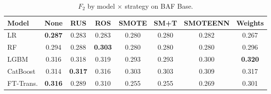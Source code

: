 \begin{table}[H]
\centering
\caption{$F_2$ by model $\times$ strategy on BAF Base.}
\label{tab:factorial_baf_f2}
\begin{tabular}{l c c c c c c c}
\toprule
Model & None & RUS & ROS & SMOTE & SM+T & SMOTEENN & Weights \\
\midrule
LR         & \textbf{0.287} & 0.283 & 0.283 & 0.280 & 0.280 & 0.282 & 0.267 \\
RF         & 0.294 & 0.288 & \textbf{0.303} & 0.280 & 0.280 & 0.280 & 0.296 \\
LGBM       & 0.316 & 0.318 & 0.319 & 0.293 & 0.293 & 0.300 & \textbf{0.320} \\
CatBoost   & 0.314 & \textbf{0.317} & 0.316 & 0.303 & 0.303 & 0.309 & 0.317 \\
FT-Trans.  & \textbf{0.316} & 0.289 & 0.310 & 0.255 & 0.255 & 0.269 & 0.301 \\
\bottomrule
\end{tabular}
\end{table}